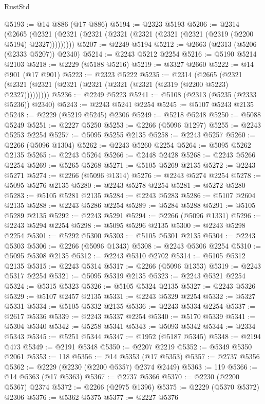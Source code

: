 \begin{lexlean}{RustStd}
\begin{coremodule}
@5193 := @14 @886 (@17 @886)
@5194 := @2323 @5193
@5206 := @2314
    (@2665 (@2321 (@2321 (@2321 (@2321 (@2321 (@2321 (@2321 (@2319 (@2200 @5194) @2327)))))))))
@5207 := @2249 @5194
@5212 := @2663 (@2313 (@5206 (@2333 @5207)) @2340)
@5214 := @2243 @5212 @2254
@5216 := @5190 @5214 @2103
@5218 := @2229 (@5188 @5216)
@5219 := @3327 @2660
@5222 := @14 @901 (@17 @901)
@5223 := @2323 @5222
@5235 := @2314
    (@2665 (@2321 (@2321 (@2321 (@2321 (@2321 (@2321 (@2321 (@2319 (@2200 @5223) @2327)))))))))
@5236 := @2249 @5223
@5241 := @5108 (@2313 (@5235 (@2333 @5236)) @2340)
@5243 := @2243 @5241 @2254
@5245 := @5107 @5243 @2135
@5248 := @2229 (@5219 @5245) @2306
@5249 := @5218 @5248
@5250 := @5088 @5249
@5251 := @2227 @5250
@5253 := @2266 (@5096 @1297)
@5255 := @2243 @5253 @2254
@5257 := @5095 @5255 @2135
@5258 := @2243 @5257
@5260 := @2266 (@5096 @1304)
@5262 := @2243 @5260 @2254
@5264 := @5095 @5262 @2135
@5265 := @2243 @5264
@5266 := @2448 @2428
@5268 := @2243 @5266 @2254
@5269 := @5265 @5268
@5271 := @5105 @5269 @2135
@5272 := @2243 @5271
@5274 := @2266 (@5096 @1314)
@5276 := @2243 @5274 @2254
@5278 := @5095 @5276 @2135
@5280 := @2243 @5278 @2254
@5281 := @5272 @5280
@5283 := @5105 @5281 @2135
@5284 := @2243 @5283
@5286 := @5107 @2604 @2135
@5288 := @2243 @5286 @2254
@5289 := @5284 @5288
@5291 := @5105 @5289 @2135
@5292 := @2243 @5291
@5294 := @2266 (@5096 @1331)
@5296 := @2243 @5294 @2254
@5298 := @5095 @5296 @2135
@5300 := @2243 @5298 @2254
@5301 := @5292 @5300
@5303 := @5105 @5301 @2135
@5304 := @2243 @5303
@5306 := @2266 (@5096 @1343)
@5308 := @2243 @5306 @2254
@5310 := @5095 @5308 @2135
@5312 := @2243 @5310 @2702
@5314 := @5105 @5312 @2135
@5315 := @2243 @5314
@5317 := @2266 (@5096 @1353)
@5319 := @2243 @5317 @2254
@5321 := @5095 @5319 @2135
@5323 := @2243 @5321 @2254
@5324 := @5315 @5323
@5326 := @5105 @5324 @2135
@5327 := @2243 @5326
@5329 := @5107 @2457 @2135
@5331 := @2243 @5329 @2254
@5332 := @5327 @5331
@5334 := @5105 @5332 @2135
@5336 := @2243 @5334 @2254
@5337 := @2617 @5336
@5339 := @2243 @5337 @2254
@5340 := @5170 @5339
@5341 := @5304 @5340
@5342 := @5258 @5341
@5343 := @5093 @5342
@5344 := @2334 @5343
@5345 := @5251 @5344
@5347 := @1952 (@5187 @5345)
@5348 := @2194 @473
@5349 := @2191 @5348
@5350 := @2207 @2219
@5352 := @5349 @5350 @2061
@5353 := 118
@5356 := @14 @5353 (@17 @5353)
@5357 := @2737 @5356
@5362 := @2229 (@2230 (@2200 @5357) @2374 @2449)
@5363 := 119
@5366 := @14 @5363 (@17 @5363)
@5367 := @2737 @5366
@5370 := @2230 (@2200 @5367) @2374
@5372 := @2266 (@2975 @1396)
@5375 := @2229 (@5370 @5372) @2306
@5376 := @5362 @5375
@5377 := @2227 @5376

\end{coremodule}
\end{lexlean}
